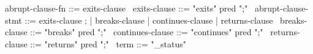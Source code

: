 \begin{syntax}
  abrupt-clause-fn ::= exits-clause
  \
  exits-clause ::= "exits" pred ";"
  \
  abrupt-clause-stmt ::= exits-clause ;
        | breaks-clause | continues-clause | returns-clause
  \
  breaks-clause ::= "breaks" pred ";"
  \
  continues-clause ::= "continues" pred ";"
  \
  returns-clause ::= "returns" pred ";"
  \
  term  ::= "\exit_status"
\end{syntax}
